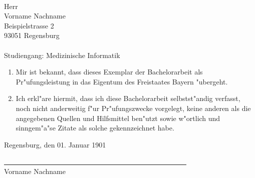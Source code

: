 %
%
\text{ }
\vspace{7cm}
\\
Herr\\
Vorname Nachname\\
Beispielstrasse 2\\
93051 Regensburg\\\\
Studiengang: Medizinische Informatik\\

\begin{enumerate}
\item Mir ist bekannt, dass dieses Exemplar der Bachelorarbeit als Pr"ufungsleistung in das Eigentum des Freistaates Bayern "ubergeht.
\item Ich erkl"are hiermit, dass ich diese Bachelorarbeit selbstst"andig verfasst, noch nicht anderweitig f"ur Pr"ufungszwecke vorgelegt, keine anderen als die angegebenen Quellen und Hilfsmittel ben"utzt sowie w"ortlich und sinngem"a"se Zitate als solche gekennzeichnet habe.
\end{enumerate}
\vspace{1cm}
Regensburg, den 01. Januar 1901\\
\medskip
\medskip

\underline{~~~~~~~~~~~~~~~~~~~~~~~~~~~~~~~~~~~~~~~~~~~~~~~~~~~~}\\
Vorname Nachname\\


